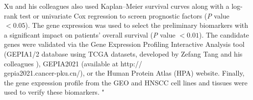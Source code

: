 \documentclass[preprint,12pt]{elsarticle}
\newenvironment{MyIndent}
{\par\leftskip1cm\relax\rightskip1cm\relax}
{\par\leftskip0cm\relax\rightskip0cm\relax}
\newenvironment{MyColorPar}[1]{%
    \leavevmode\color{#1}\ignorespaces%
}{%
}%
\begin{document}
\begin{MyColorPar}{blue}
\begin{MyIndent}
\begin{MyColorPar}{red}
Xu and his colleagues\cite{Xu2021a} also used Kaplan–Meier survival curves along with a log-rank test or univariate Cox regression to screen prognostic factors (\textit{P} value $< 0.05$).
The gene expression was used to select the preliminary biomarkers with a significant impact on patients' overall survival (\textit{P} value $< 0.01$).
The candidate genes were validated via the Gene Expression Profiling Interactive Analysis tool (GEPIA1/2 database using TCGA datasets, developed by Zefang Tang and his colleagues\cite{Tang2017a}\cite{Tang2019}
), GEPIA2021\cite{Li2021} (available at http://\\gepia2021.cancer-pku.cn/), or the Human Protein Atlas (HPA) website.
Finally, the gene expression profile from the GEO and HNSCC cell lines and tissues were used to verify these biomarkers.
"






\end{MyColorPar}
\end{MyIndent}
\end{MyColorPar}
\end{document}
